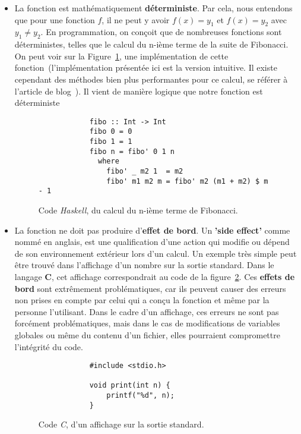 \begin{itemize}
    \item[\textbullet] La fonction est mathématiquement 
    \textbf{déterministe}. Par cela, nous entendons que pour une fonction \(f\), 
    il ne peut y avoir \(f(x) = y_1\) et \(f(x) = y_2\) avec \(y_1 \neq y_2\). 
    En programmation, on conçoit que de nombreuses fonctions sont déterministes, 
    telles que le calcul du n-ième terme de la suite de Fibonacci. On peut voir 
    sur la Figure~\ref{fig:progFiboHaskell}, une 
    implémentation de cette fonction~(l'implémentation présentée ici est la 
    version intuitive. Il existe cependant des méthodes bien plus performantes 
    pour ce calcul, se référer à l'article de blog~\cite{citationFiboProg}).
    Il vient de manière logique que notre fonction est déterministe
    \begin{figure}[H]
        \begin{verbatim}
            fibo :: Int -> Int
            fibo 0 = 0
            fibo 1 = 1
            fibo n = fibo' 0 1 n
              where
                fibo' _ m2 1  = m2
                fibo' m1 m2 m = fibo' m2 (m1 + m2) $ m - 1
        \end{verbatim}
        \caption{
            Code \textit{Haskell}, du calcul du n-ième terme de Fibonacci.
        }\label{fig:progFiboHaskell}
    \end{figure}

    \item[\textbullet] La fonction ne doit pas produire 
    d'\textbf{effet de bord}. Un \textbf{'side effect'} comme nommé en anglais, 
    est une qualification d'une action qui modifie ou dépend de son environnement 
    extérieur lors d'un calcul. Un exemple très simple peut être trouvé dans 
    l'affichage d'un nombre sur la sortie standard. Dans le langage \textbf{C},
    cet affichage correspondrait au code de la figure~\ref{fig:progAfficheC}.
    Ces \textbf{effets de bord} sont extrêmement problématiques, car ils 
    peuvent causer des erreurs non prises en compte par celui qui a conçu la 
    fonction et même par la personne l'utilisant. Dans le cadre d'un affichage, 
    ces erreurs ne sont pas forcément problématiques, mais dans le cas de 
    modifications de variables globales ou même du contenu d'un fichier, elles 
    pourraient compromettre l'intégrité du code.
    \begin{figure}[H]
        \begin{verbatim}
            #include <stdio.h>

            void print(int n) {
                printf("%d", n);
            }
        \end{verbatim}
        \caption{
            Code \textit{C}, d'un affichage sur la sortie standard.
        }\label{fig:progAfficheC}
    \end{figure}
\end{itemize}

